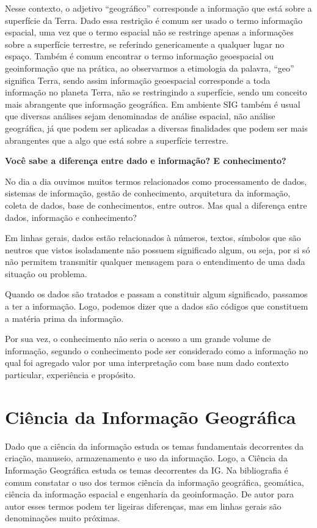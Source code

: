 \documentclass[
]{book}
\begin{document}
Nesse contexto, o adjetivo ``geográfico'' corresponde a informação que está sobre a superfície da Terra. Dado essa restrição é comum ser usado o termo informação espacial, uma vez que o termo espacial não se restringe apenas a informações sobre a superfície terrestre, se referindo genericamente a qualquer lugar no espaço. Também é comum encontrar o termo informação geoespacial ou geoinformação que na prática, ao observarmos a etimologia da palavra, ``geo'' significa Terra, sendo assim informação geoespacial corresponde a toda informação no planeta Terra, não se restringindo a superfície, sendo um conceito mais abrangente que informação geográfica. Em ambiente SIG também é usual que diversas análises sejam denominadas de análise espacial, não análise geográfica, já que podem ser aplicadas a diversas finalidades que podem ser mais abrangentes que a algo que está sobre a superfície terrestre.

\textbf{Você sabe a diferença entre dado e informação? E conhecimento?}

No dia a dia ouvimos muitos termos relacionados como processamento de dados, sistemas de informação, gestão de conhecimento, arquitetura da informação, coleta de dados, base de conhecimentos, entre outros. Mas qual a diferença entre dados, informação e conhecimento?

Em linhas gerais, dados estão relacionados à números, textos, símbolos que são neutros que vistos isoladamente não possuem significado algum, ou seja, por si só não permitem transmitir qualquer mensagem para o entendimento de uma dada situação ou problema.

Quando os dados são tratados e passam a constituir algum significado, passamos a ter a informação. Logo, podemos dizer que a dados são códigos que constituem a matéria prima da informação.

Por sua vez, o conhecimento não seria o acesso a um grande volume de informação, segundo \citet{longley2013} o conhecimento pode ser considerado como a informação no qual foi agregado valor por uma interpretação com base num dado contexto particular, experiência e propósito.

\hypertarget{ciuxeancia-da-informauxe7uxe3o-geogruxe1fica}{%
\section{Ciência da Informação Geográfica}\label{ciuxeancia-da-informauxe7uxe3o-geogruxe1fica}}

Dado que a ciência da informação estuda os temas fundamentais decorrentes da criação, manuseio, armazenamento e uso da informação. Logo, a Ciência da Informação Geográfica estuda os temas decorrentes da IG.
Na bibliografia é comum constatar o uso dos termos ciência da informação geográfica, geomática, ciência da informação espacial e engenharia da geoinformação. De autor para autor esses termos podem ter ligeiras diferenças, mas em linhas gerais são denominações muito próximas.
\end{document}
